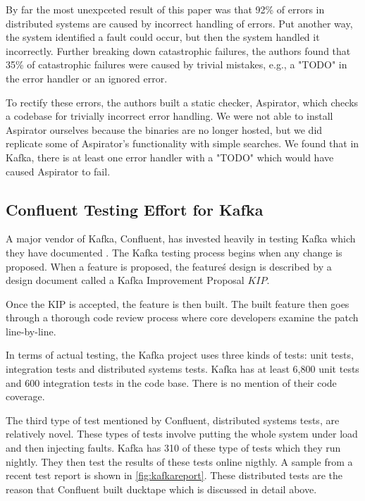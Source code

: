 By far the most unexpceted result of this paper was that 92\% of errors in distributed systems are caused by incorrect handling of errors.
Put another way, the system identified a fault could occur, but then the system handled it incorrectly.
Further breaking down catastrophic failures, the authors found that 35\% of catastrophic failures were caused by trivial mistakes, e.g., a "TODO" in the error handler or an ignored error.

To rectify these errors, the authors built a static checker, Aspirator, which checks a codebase for trivially incorrect error handling.
We were not able to install Aspirator ourselves because the binaries are no longer hosted, but we did replicate some of Aspirator's functionality with simple searches.
We found that in Kafka, there is at least one error handler with a "TODO" which would have caused Aspirator to fail.

\subsection{Confluent Testing Effort for Kafka}

A major vendor of Kafka, Confluent, has invested heavily in testing Kafka which they have documented \cite{confluenttesting}.
The Kafka testing process begins when any change is proposed.
When a feature is proposed, the feature\'s design is described by a design document called a Kafka Improvement Proposal \(KIP\).

Once the KIP is accepted, the feature is then built.
The built feature then goes through a thorough code review process where core developers examine the patch line-by-line.

In terms of actual testing, the Kafka project uses three kinds of tests: unit tests, integration tests and distributed systems tests.
Kafka has at least 6,800 unit tests and 600 integration tests in the code base.
There is no mention of their code coverage.

The third type of test mentioned by Confluent, distributed systems tests, are relatively novel.
These types of tests involve putting the whole system under load and then injecting faults.
Kafka has 310 of these type of tests which they run nightly.
They then test the results of these tests online nigthly.
A sample from a recent test report is shown in \ref{fig:kafkareport}.
These distributed tests are the reason that Confluent built ducktape which is discussed in detail above.

